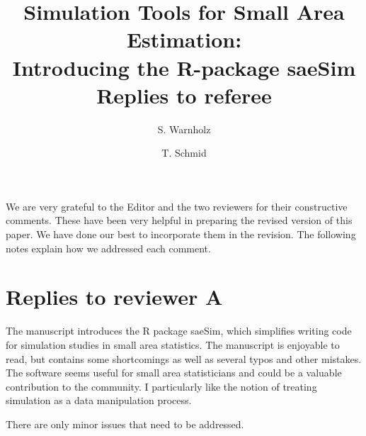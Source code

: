 \documentclass[11pt]{article}
\begin{document}
\title{{Simulation Tools for Small Area Estimation:\\
Introducing the R-package saeSim} \\Replies to referee}
\author{S. Warnholz
\and T. Schmid
}

\date{} \maketitle







We are very grateful to the Editor and the two reviewers for their constructive comments. These have been very helpful in preparing the revised version of this paper. We have done our best to incorporate them in the revision. The following notes explain how we addressed each comment.

\section*{Replies to reviewer A}

The manuscript introduces the R package saeSim, which simplifies writing code for simulation studies in small area statistics. The manuscript is enjoyable to read, but contains some shortcomings as well as several typos and other mistakes. The software seems useful for small area statisticians and could be a valuable contribution to the community. I particularly like the notion of treating simulation as a data manipulation process.

\vspace{0.5cm}

\noindent There are only minor issues that need to be addressed.
\end{document}

